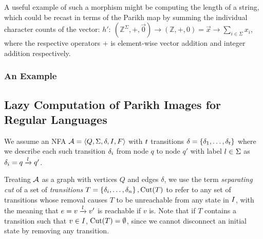 \documentclass[runningheads]{llncs}
\newif\ifoutline
\newcommand{\contents}[1]{\ifoutline{\color{blue}
    \begin{itemize}
    #1
    \end{itemize}
  }\fi}
\begin{document}
A useful example of such a morphism might be computing the length of a string, which could be recast in terms of the Parikh map by summing the individual character counts of the vector: $h':\: (\mathbb{Z}^\Sigma, +, \vec{0}) \to (\mathbb{Z}, +, 0) = \vec{x} \to \sum_{i \in \Sigma} x_i$, where the respective operators $+$ is element-wise vector addition and integer addition respectively.

\subsubsection{An Example}

\subsection{Lazy Computation of Parikh Images for Regular Languages}

\contents{
\item Lazy expansion of the Parikh conditions for a symbolic automaton
\item Finding elements vs.\ computing the complete Parikh image
\item Lazy product computation
}


\contents{
  \item Preliminaries, the underlying calculus, what are rules
  \item Predicates used to represent Parikh images
  \item Our calculus rules
  \item Statement of properties, correctness, complexity
  }

  \contents{
  \item remove the monoid map!!!
}

We assume an NFA $\mathcal{A} = \left\langle Q, \Sigma, \delta, I,
F\right\rangle$ with $t$ transitions $\delta =
\left\{\delta_{1}, \ldots, \delta_{t}\right\}$ where we describe each
such transition $\delta_i$ from node $q$ to node $q'$ with label $l \in \Sigma$ as
$\delta_i = q \xrightarrow{l} q'$.

Treating $\mathcal{A}$ as a graph with vertices $Q$ and edges $\delta$, we use
the term \textit{separating cut} of a set of \textit{transitions} $T =
\left\{\delta_i, \ldots, \delta_n\right\}, \operatorname{Cut}(T)$ to refer to any
set of transitions whose removal causes $T$ to be unreachable from any state in
$I$, with the meaning that $e = v \xrightarrow{l} v'$ is reachable
if $v$ is. Note that if $T$ contains a transition  such that $v \in I$,
$\operatorname{Cut}(T) = \emptyset$, since we cannot disconnect an initial state by
removing any transition.
\end{document}
